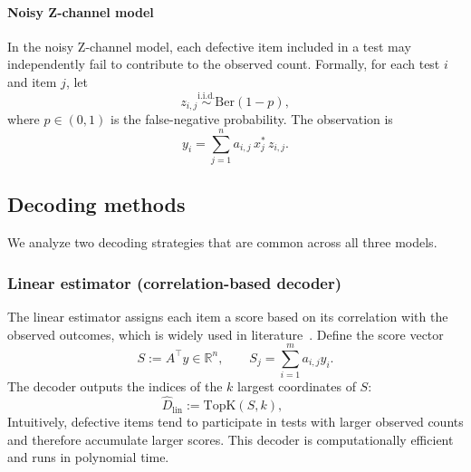 \documentclass{article}
\newcommand{\E}{\mathbb{E}}
\newcommand{\Ber}{\mathrm{Ber}}
\begin{document}
\paragraph{Noisy Z-channel model}
In the noisy Z-channel model, each defective item included in a test may independently fail to contribute to the observed count.
Formally, for each test $i$ and item $j$, let
\[
z_{i,j} \stackrel{\text{i.i.d.}}{\sim} \Ber(1-p),
\]
where $p\in(0,1)$ is the false-negative probability.
The observation is
\begin{equation}
y_i = \sum_{j=1}^n a_{i,j}\,x_j^*\,z_{i,j}.
\label{eq:zchannel}
\end{equation}

\subsection{Decoding methods}
We analyze two decoding strategies that are common across all three models.

\subsubsection{Linear estimator (correlation-based decoder)}
The linear estimator assigns each item a score based on its correlation with the observed outcomes, which is widely used in literature~\cite{hahn-klimroth_distributed_2022,mazumdar2025exact,gebhard2019quantitative}.
Define the score vector
\begin{equation}
S := A^\top y \in \mathbb{R}^n,
\qquad
S_j = \sum_{i=1}^m a_{i,j} y_i.
\label{eq:score}
\end{equation}
The decoder outputs the indices of the $k$ largest coordinates of $S$:
\begin{equation}
\widehat{D}_{\mathrm{lin}} := \mathrm{TopK}(S,k),
\qquad
\label{eq:linear-decoder}
\end{equation}
Intuitively, defective items tend to participate in tests with larger observed counts and therefore accumulate larger scores.
This decoder is computationally efficient and runs in polynomial time.
\end{document}
